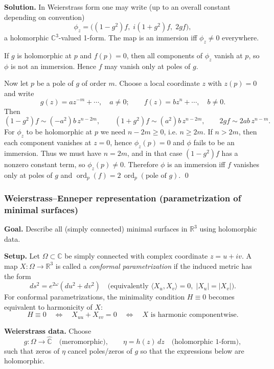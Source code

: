 \documentclass[12pt,a4paper]{article}
\DeclareMathOperator{\ord}{ord}
\theoremstyle{plain}
\theoremstyle{definition}      %
\begin{document}
	\medskip
	\textbf{Solution.}
	In Weierstrass form one may write (up to an overall constant depending on convention)
	\[
	\phi_z = \big((1-g^2)f,\; i(1+g^2)f,\; 2gf\big),
	\]
	a holomorphic $\mathbb C^3$-valued 1-form. The map is an immersion iff $\phi_z\neq 0$ everywhere.
	
	If $g$ is holomorphic at $p$ and $f(p)=0$, then all components of $\phi_z$ vanish at $p$, so $\phi$ is not an
	immersion. Hence $f$ may vanish only at poles of $g$.
	
	Now let $p$ be a pole of $g$ of order $m$. Choose a local coordinate $z$ with $z(p)=0$ and write
	\[
	g(z)=a z^{-m}+\cdots,\quad a\neq 0;\qquad f(z)=b z^{n}+\cdots,\quad b\neq 0.
	\]
	Then
	\[
	(1-g^2)f \sim (-a^2)b\,z^{n-2m},\qquad (1+g^2)f\sim (a^2)b\,z^{n-2m},\qquad 2gf\sim 2ab\,z^{n-m}.
	\]
	For $\phi_z$ to be holomorphic at $p$ we need $n-2m\ge 0$, i.e. $n\ge 2m$.
	If $n>2m$, then each component vanishes at $z=0$, hence $\phi_z(p)=0$ and $\phi$ fails to be an immersion.
	Thus we must have $n=2m$, and in that case $(1-g^2)f$ has a nonzero constant term, so $\phi_z(p)\neq 0$.
	Therefore $\phi$ is an immersion iff $f$ vanishes only at poles of $g$ and $\ord_p(f)=2\,\ord_p(\text{pole of }g)$.
	\qed
	
	\subsubsection*{Weierstrass--Enneper representation (parametrization of minimal surfaces)}
	
	\textbf{Goal.} Describe all (simply connected) minimal surfaces in $\mathbb{R}^3$ using holomorphic data.
	
	\medskip
	\textbf{Setup.}
	Let $\Omega\subset\mathbb{C}$ be simply connected with complex coordinate $z=u+iv$.
	A map $X:\Omega\to\mathbb{R}^3$ is called a \emph{conformal parametrization} if the induced metric has the form
	\[
	ds^2 = e^{2\omega}(du^2+dv^2)
	\quad\text{(equivalently } \langle X_u,X_v\rangle=0,\; |X_u|=|X_v|\text{)}.
	\]
	For conformal parametrizations, the minimality condition $H\equiv 0$ becomes equivalent to harmonicity of $X$:
	\[
	H\equiv 0 \quad\Longleftrightarrow\quad X_{uu}+X_{vv}=0
	\quad\Longleftrightarrow\quad X \text{ is harmonic componentwise.}
	\]
	
	\medskip
	\textbf{Weierstrass data.}
	Choose
	\[
	g:\Omega\to\widehat{\mathbb{C}} \quad\text{(meromorphic)},\qquad
	\eta = h(z)\,dz \quad\text{(holomorphic 1-form)},
	\]
	such that zeros of $\eta$ cancel poles/zeros of $g$ so that the expressions below are holomorphic.
	
\end{document}

